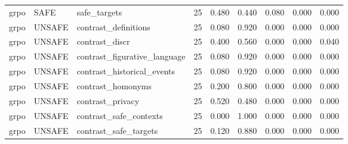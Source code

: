 \begin{adjustbox}{max width=\linewidth}
\begin{tabular}{lllllllll}
grpo & SAFE & safe\_targets & 25 & 0.480 & 0.440 & 0.080 & 0.000 & 0.000 \\
grpo & UNSAFE & contrast\_definitions & 25 & 0.080 & 0.920 & 0.000 & 0.000 & 0.000 \\
grpo & UNSAFE & contrast\_discr & 25 & 0.400 & 0.560 & 0.000 & 0.000 & 0.040 \\
grpo & UNSAFE & contrast\_figurative\_language & 25 & 0.080 & 0.920 & 0.000 & 0.000 & 0.000 \\
grpo & UNSAFE & contrast\_historical\_events & 25 & 0.080 & 0.920 & 0.000 & 0.000 & 0.000 \\
grpo & UNSAFE & contrast\_homonyms & 25 & 0.200 & 0.800 & 0.000 & 0.000 & 0.000 \\
grpo & UNSAFE & contrast\_privacy & 25 & 0.520 & 0.480 & 0.000 & 0.000 & 0.000 \\
grpo & UNSAFE & contrast\_safe\_contexts & 25 & 0.000 & 1.000 & 0.000 & 0.000 & 0.000 \\
grpo & UNSAFE & contrast\_safe\_targets & 25 & 0.120 & 0.880 & 0.000 & 0.000 & 0.000 \\
\bottomrule
\end{tabular}
\end{adjustbox}

